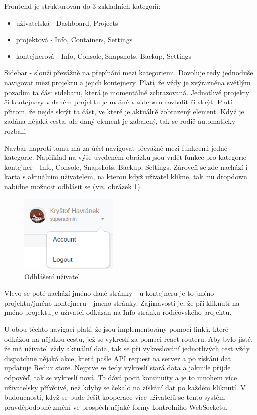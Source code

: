 \documentclass[a4paper,oneside,12pt]{report}
\begin{document}
\newpage

Frontend je strukturován do 3 základních kategorií:
\begin{itemize}
	\item uživatelská - Dashboard, Projects
	\item projektová - Info, Containers, Settings
	\item kontejnerová - Info, Console, Snapshots, Backup, Settings
\end{itemize}

Sidebar - slouží převážně na přepínání mezi kategoriemi.
Dovoluje tedy jednoduše navigovat mezi projektu a jejich kontejnery.
Platí, že vždy je zvýrazněna světlým pozadím ta část sidebaru, která je momentálně zobrazovaná.
Jednotlivé projekty či kontejnery v daném projektu je možné v sidebaru rozbalit či skrýt.
Platí přitom, že nejde skrýt ta část, ve které je aktuálně zobrazený element.
Když je zadána nějaká cesta, ale daný element je zabalený, tak se rodič automaticky rozbalí.

Navbar naproti tomu má za účel navigovat převážně mezi funkcemi jedné kategorie.
Například na výše uvedeném obrázku jsou vidět funkce pro kategorie kontejner - Info, Console, Snapshots, Backup, Settings.
Zároveň se zde nachází i karta s aktuálním uživatelem, na kterou když uživatel klikne, tak mu dropdown nabídne možnost odhlásit se (viz. obrázek \ref{fig:logout}).

\begin{figure}[h]
	\centering
	\includegraphics[height=3.8cm]{../img/logout.png}
	\caption[Odhlášení uživatele, vlastní tvorba]{Odhlášení uživatel \linebreak}
	\label{fig:logout}
\end{figure}

Vlevo se poté nachází jméno dané stránky - u kontejneru je to jméno projektu/jméno kontejneru - jméno stránky.
Zajímavostí je, že při kliknutí na jméno projektu je uživatel odkázán na Info stránku rodičovského projektu.

U obou těchto navigací platí, že jsou implementovány pomocí linků, které odkážou na nějakou cestu, jež se vykreslí za pomoci react-routeru.
Aby bylo jisté, že má uživatel vždy aktuální data, tak se při vykreslování jednotlivých cest vždy dispatchne nějaká akce, která pošle API request na server a po získání dat updatuje Redux store.
Nejprve se tedy vykreslí stará data a jakmile přijde odpověď, tak se vykreslí nová.
To dává pocit kontinuity a je to mnohem více uživatelsky přívětivé, než kdyby se čekalo na získání dat po každém kliknutí.
V budoucnosti, když se bude řešit kooperace více uživatelů se tento systém pravděpodobně změní ve prospěch nějaké formy kontrolního WebSocketu.
\end{document}
